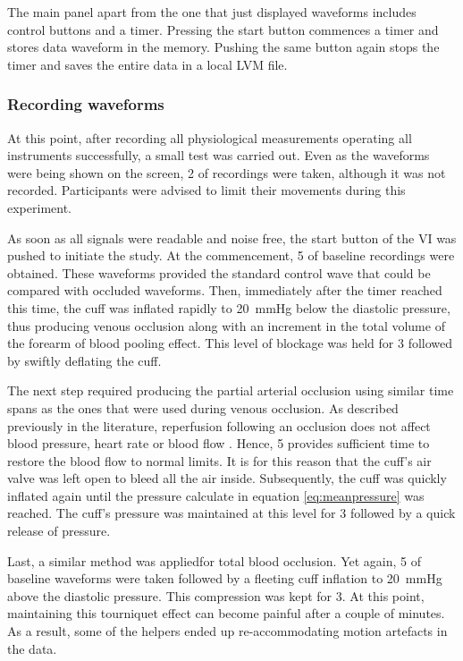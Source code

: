 The main panel apart from the one that just displayed waveforms includes control buttons and a timer.  Pressing the start button commences a timer and stores data waveform in the memory. Pushing the same button again stops the timer and saves the entire data in a local LVM file. 


\subsubsection{Recording waveforms}
At this point, after recording all physiological measurements operating all instruments successfully, a small test was carried out. Even as the waveforms were being shown on the screen, \SI{2}{\min} of recordings were taken, although it was not recorded. Participants were advised to limit their movements during this experiment. 

As soon as all signals were readable and noise free, the start button of the VI was pushed to initiate the study. At the commencement, \SI{5}{\min} of baseline recordings were obtained. These waveforms provided the standard control wave that could be compared with occluded waveforms. Then, immediately after the timer reached this time, the cuff was inflated rapidly to \SI{20}{\mmHg} below the diastolic pressure, thus producing venous occlusion along with an increment in the total volume of the forearm of blood pooling effect. This level of blockage was held for \SI{3}{\min} followed by swiftly deflating the cuff. 

The next step required producing the partial arterial occlusion using similar time spans as the ones that were used during venous occlusion. As described previously in the literature, reperfusion following an occlusion does not affect blood pressure, heart rate or blood flow \cite{kharbanda2002transient}. Hence, \SI{5}{\min} provides sufficient time to restore the blood flow to normal limits. It is for this reason that the cuff's air valve was left open to bleed all the air inside. Subsequently, the cuff was quickly inflated again until the pressure calculate in equation \ref{eq:meanpressure} was reached. The cuff's pressure was maintained at this level for \SI{3}{\min} followed by a quick release of pressure.

Last, a similar method was appliedfor total blood occlusion. Yet again, \SI{5}{\min} of baseline waveforms were taken followed by a fleeting cuff inflation to \SI{20}{\mmHg} above the diastolic pressure. This compression was kept for \SI{3}{\min}. At this point, maintaining this tourniquet effect can become painful after a couple of minutes. As a result, some of the helpers ended up re-accommodating motion artefacts in the data. 

